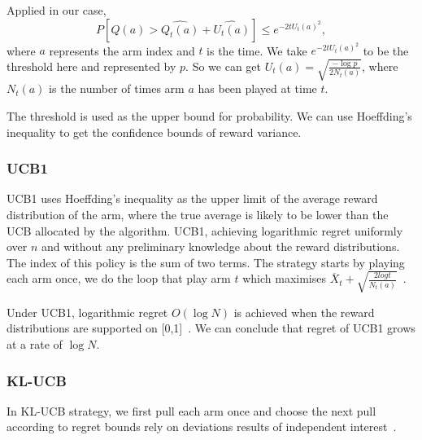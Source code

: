 Applied in our case,
\[P[Q(a) >\widehat{Q_t (a)}+\widehat{U_t (a)}] \leq e^{-2t U_t(a)^2},\]
where $a$ represents the arm index and $t$ is the time.
We take $e^{-2t U_t(a)^2} $ to be the threshold here and represented by $p$.
So we can get $U_t(a) = \sqrt{\frac{-\log p}{2N_t (a)}}$, where $N_t (a)$ is the number of times arm $a$ has been played at time $t$.

The threshold is used as the upper bound for probability.
We can use Hoeffding's inequality to get the confidence bounds of reward variance.

\subsubsection{UCB1}
UCB1 uses Hoeffding's inequality as the upper limit of the average reward distribution of the arm, where the true average is likely to be lower than the UCB allocated by the algorithm.
UCB1, achieving logarithmic regret uniformly over $n$ and without any preliminary knowledge about the reward distributions.
The index of this policy is the sum of two terms.
The strategy starts by playing each arm once, we do the loop that play arm $t$ which maximises $\overline X_t + \sqrt{\frac{2log t}{N_t (a)}}$~\citep{Auer2002}.

Under UCB1, logarithmic regret $O(\log N)$  is achieved when the reward distributions are supported on [0,1]~\citep{Chan_2020}.
We can conclude that regret of UCB1 grows at a rate of $\log N$.
\par

\subsubsection{KL-UCB}
In KL-UCB strategy, we first pull each arm once and choose the next pull according to regret bounds rely on deviations results of independent interest~\citep{Garivier2011}.

